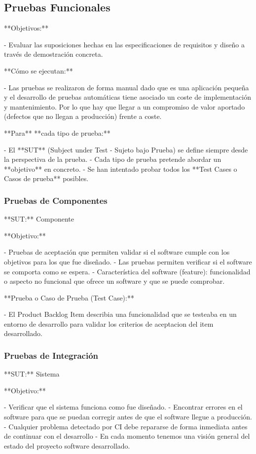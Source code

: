 \documentclass[12pt,twoside,titlepage]{report}
\begin{document}
\subsection{Pruebas Funcionales}

**Objetivos:**

- Evaluar las suposiciones hechas en las especificaciones de requisitos y diseño a través de demostración concreta.

**Cómo se ejecutan:**

- Las pruebas se realizaron de forma manual dado que es una aplicación pequeña y el desarrollo de pruebas automáticas tiene asociado un coste de implementación y mantenimiento. Por lo que hay que llegar a un compromiso de valor aportado (defectos que no llegan a producción) frente a coste.

**Para** **cada tipo de prueba:**

- El **SUT** (Subject under Test - Sujeto bajo Prueba) se define siempre desde la perspectiva de la prueba.
- Cada tipo de prueba pretende abordar un **objetivo** en concreto.
- Se han intentado probar todos los **Test Cases o Casos de prueba** posibles.

\subsubsection{Pruebas de Componentes}

**SUT:** Componente

**Objetivo:**

- Pruebas de aceptación que permiten validar si el software cumple con los objetivos para los que fue diseñado.
- Las pruebas permiten verificar si el software se comporta como se espera.
- Característica del software (feature): funcionalidad o aspecto no funcional que ofrece un software y que se puede comprobar.

**Prueba o Caso de Prueba (Test Case):** 

- El Product Backlog Item describia una funcionalidad que se testeaba en un entorno de desarrollo para validar los criterios de aceptacion del item desarrollado.

\subsubsection{Pruebas de Integración}

**SUT:** Sistema 

**Objetivo:**

- Verificar que el sistema funciona como fue diseñado.
- Encontrar errores en el software para que se puedan corregir antes de que el software llegue a producción.
- Cualquier problema detectado por CI debe repararse de forma inmediata antes de continuar con el desarrollo
- En cada momento tenemos una visión general del estado del proyecto software desarrollado.
\end{document}
